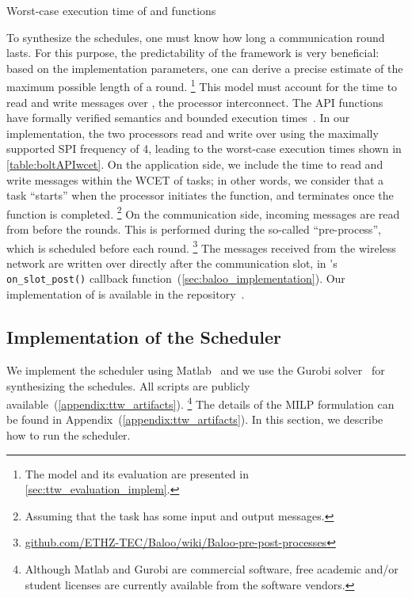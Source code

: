 \begin{table}
  \centering
  \caption{Worst-case execution time of \bolt \opread and \opwrite functions}
  \label{table:boltAPIwcet}
  {\smaller }
\end{table}


To synthesize the schedules, one must know how long a communication round lasts.
For this purpose, the predictability of the \baloo framework is very beneficial: based on the implementation parameters, one can derive a precise estimate of the maximum possible length of a round.%
%
\footnote{The \TTnet model and its evaluation are presented in \cref{sec:ttw_evaluation_implem}.\label{footnote:ttnet}}
%
This model must account for the time to read and write messages over \bolt, the \DPP processor interconnect.
The \bolt API functions have formally verified semantics and bounded execution times~\cite{sutton2015Bolt}.
In our implementation, the two processors read and write over \bolt using the maximally supported SPI frequency of 4\MHz, leading to the worst-case execution times shown in \cref{table:boltAPIwcet}.
On the application side, we include the time to read and write messages within the WCET of tasks; in other words, we consider that a task ``starts'' when the processor initiates the \bolt \opread function, and terminates once the \bolt \opwrite function is completed.%
%
\footnote{Assuming that the task has some input and output messages.}
%
On the communication side, incoming messages are read from \bolt before the rounds. This is performed during the so-called ``pre-process'', which is scheduled before each \baloo round.%
%
\footnote{\href{https://github.com/ETHZ-TEC/Baloo/wiki/Baloo-pre-post-processes}{github.com/ETHZ-TEC/Baloo/wiki/Baloo-pre-post-processes}}
%
The messages received from the wireless network are written over \bolt directly after the communication slot, in \baloo's \texttt{on\_slot\_post()} callback function~(\cref{sec:baloo_implementation}).
Our implementation of \TTnet is available in the \baloo repository~\cite{repoBaloo}.



\subsection{Implementation of the \TTW Scheduler}
\label{subsec:implem_sched}

We implement the \TTW scheduler using Matlab~\cite{Matlab} and we use the Gurobi solver~\cite{Gurobi} for synthesizing the schedules.
All scripts are publicly available~(\cref{appendix:ttw_artifacts}).%
%
\footnote{Although Matlab and Gurobi are commercial software, free academic and/or student licenses are currently available from the software vendors.}
%
The details of the MILP formulation can be found in Appendix~(\cref{appendix:ttw_artifacts}).
In this section, we describe how to run the \TTW scheduler.

